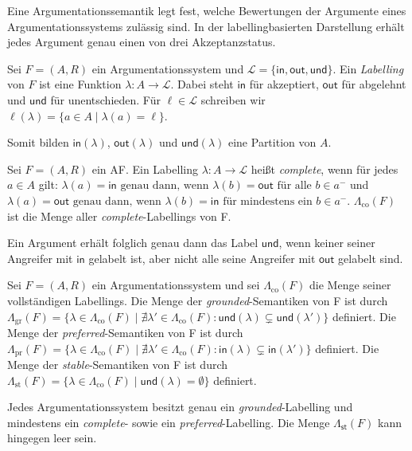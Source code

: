 Eine Argumentationssemantik legt fest, welche Bewertungen der Argumente eines
Argumentationssystems zulässig sind. In der labellingbasierten Darstellung
erhält jedes Argument genau einen von drei Akzeptanzstatus.
\begin{Definition}
    \label{def:labelling}
    Sei \(F=(A,R)\) ein Argumentationssystem und
    \(\mathcal{L}=\{\mathsf{in},\mathsf{out},\mathsf{und}\}\). Ein
    \emph{Labelling} von \(F\) ist eine Funktion
    \(\lambda\colon A\to\mathcal{L}\). Dabei steht \(\mathsf{in}\) für
    akzeptiert, \(\mathsf{out}\) für abgelehnt und \(\mathsf{und}\) für
    unentschieden. Für \(\ell\in\mathcal{L}\) schreiben wir
    \(
        \ell(\lambda)=\{a\in A \mid \lambda(a)=\ell\}.
    \)
\end{Definition}
Somit bilden \(\mathsf{in}(\lambda)\),
\(\mathsf{out}(\lambda)\) und \(\mathsf{und}(\lambda)\) eine Partition
von \(A\).
\begin{Definition}
    \label{def:complete-labelling}
    Sei \(F=(A,R)\) ein AF.
    Ein Labelling \(\lambda\colon A\to\mathcal{L}\) heißt
    \emph{complete}, wenn für jedes \(a\in A\) gilt:
    \(
        \lambda(a)=\mathsf{in}
        \text{ genau dann, wenn }
        \lambda(b)=\mathsf{out}\text{ für alle }b\in a^-
    \)
    und 
    \(
        \lambda(a)=\mathsf{out}
        \text{ genau dann, wenn }
        \lambda(b)=\mathsf{in}\text{ für mindestens ein }b\in a^-.
    \)
    \(\Lambda_{\mathrm{co}}(F)\) ist die Menge aller \emph{complete}-Labellings von F.
\end{Definition}
Ein Argument erhält folglich genau dann das Label \(\mathsf{und}\), wenn
keiner seiner Angreifer mit \(\mathsf{in}\) gelabelt ist, aber nicht alle
seine Angreifer mit \(\mathsf{out}\) gelabelt sind.
\begin{Definition}
    \label{def:af-semantics}
    Sei \(F=(A,R)\) ein Argumentationssystem und sei \(\Lambda_{\mathrm{co}}(F)\) die Menge seiner vollständigen Labellings.  
    Die Menge der \emph{grounded}-Semantiken von F ist durch \(\Lambda_{\mathrm{gr}}(F)=\{\lambda\in\Lambda_{\mathrm{co}}(F)\mid\nexists\lambda'\in\Lambda_{\mathrm{co}}(F):\mathsf{und}(\lambda)\subsetneq\mathsf{und}(\lambda')\}\) definiert. 
    Die Menge der \emph{preferred}-Semantiken von F ist durch \(\Lambda_{\mathrm{pr}}(F)=\{\lambda\in\Lambda_{\mathrm{co}}(F)\mid\nexists\lambda'\in\Lambda_{\mathrm{co}}(F):\mathsf{in}(\lambda)\subsetneq\mathsf{in}(\lambda')\}\) definiert. 
    Die Menge der \emph{stable}-Semantiken von F ist durch \(\Lambda_{\mathrm{st}}(F)=\{\lambda\in\Lambda_{\mathrm{co}}(F)\mid\mathsf{und}(\lambda)=\emptyset\}\) definiert.
\end{Definition}
Jedes Argumentationssystem besitzt genau ein \emph{grounded}-Labelling und
mindestens ein \emph{complete}- sowie ein \emph{preferred}-Labelling. Die Menge
\(\Lambda_{\mathsf{st}}(F)\) kann hingegen leer sein.

